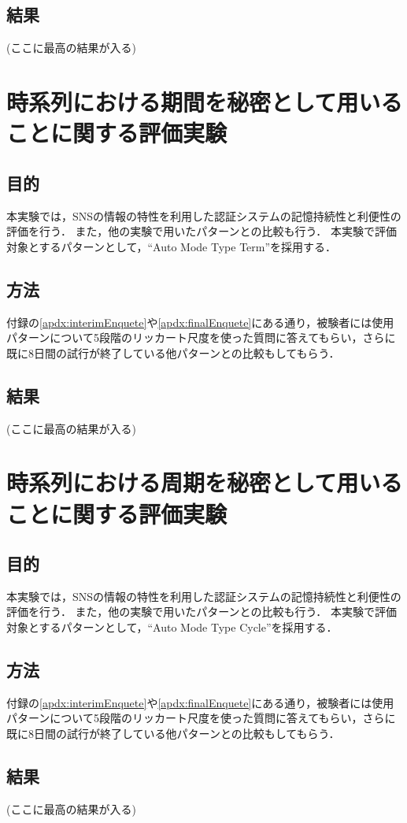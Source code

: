 \subsection{結果}
(ここに最高の結果が入る)

\section{時系列における期間を秘密として用いることに関する評価実験}\label{sec:vsTerm}
\subsection{目的}
本実験では，SNSの情報の特性を利用した認証システムの記憶持続性と利便性の評価を行う．
また，他の実験で用いたパターンとの比較も行う．
本実験で評価対象とするパターンとして，``Auto Mode Type Term''を採用する．

\subsection{方法}
付録の\ref{apdx:interimEnquete}や\ref{apdx:finalEnquete}にある通り，被験者には使用パターンについて5段階のリッカート尺度を使った質問に答えてもらい，さらに既に8日間の試行が終了している他パターンとの比較もしてもらう．

\subsection{結果}
(ここに最高の結果が入る)

\section{時系列における周期を秘密として用いることに関する評価実験}\label{sec:vsCycle}
\subsection{目的}
本実験では，SNSの情報の特性を利用した認証システムの記憶持続性と利便性の評価を行う．
また，他の実験で用いたパターンとの比較も行う．
本実験で評価対象とするパターンとして，``Auto Mode Type Cycle''を採用する．

\subsection{方法}
付録の\ref{apdx:interimEnquete}や\ref{apdx:finalEnquete}にある通り，被験者には使用パターンについて5段階のリッカート尺度を使った質問に答えてもらい，さらに既に8日間の試行が終了している他パターンとの比較もしてもらう．

\subsection{結果}
(ここに最高の結果が入る)

\newpage

